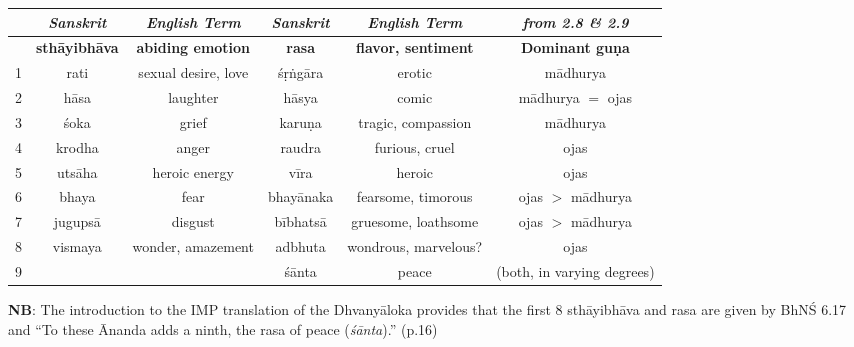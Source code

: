 \documentclass[10pt]{article}
\begin{document}
\vspace{2mm}
\begin{tabular}{|c||c|c||c|c||c|}
	\hline
	  & \textit{Sanskrit}    & \textit{English Term}    & \textit{Sanskrit} & \textit{English Term}      & \textit{from 2.8 \& 2.9}   \\
	\hline
	  & \textbf{sthāyibhāva} & \textbf{abiding emotion} & \textbf{rasa}     & \textbf{flavor, sentiment} & \textbf{Dominant guṇa}     \\
	\hline
	1 & rati                 & sexual desire, love      & śṛṅgāra           & erotic                     & mādhurya                   \\
	\hline
	2 & hāsa                 & laughter                 & hāsya             & comic                      & mādhurya \(=\) ojas        \\
	\hline
	3 & śoka                 & grief                    & karuṇa            & tragic, compassion         & mādhurya                   \\
	\hline
	4 & krodha               & anger                    & raudra            & furious, cruel             & ojas                       \\
	\hline
	5 & utsāha               & heroic energy            & vīra              & heroic                     & ojas                       \\
	\hline
	6 & bhaya                & fear                     & bhayānaka         & fearsome, timorous         & ojas \(>\) mādhurya        \\
	\hline
	7 & jugupsā              & disgust                  & bībhatsā          & gruesome, loathsome        & ojas \(>\) mādhurya        \\
	\hline
	8 & vismaya              & wonder, amazement        & adbhuta           & wondrous, marvelous?       & ojas                       \\
	\hline
	9 &                      &                          & śānta             & peace                      & (both, in varying degrees) \\
	\hline
\end{tabular}
\vspace{1mm}

\textbf{NB}: The introduction to the IMP translation of the Dhvanyāloka provides that the first 8 sthāyibhāva and rasa are given by BhNŚ 6.17 and ``To these Ānanda adds a ninth, the rasa of peace (\textit{śānta}).'' (p.16)
\end{document}
